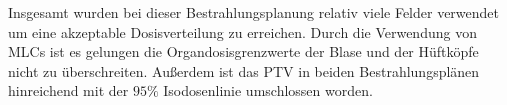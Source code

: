 Insgesamt wurden bei dieser Bestrahlungsplanung relativ viele Felder verwendet um eine
akzeptable Dosisverteilung zu erreichen. Durch die Verwendung von MLCs ist es gelungen
die Organdosisgrenzwerte der Blase und der Hüftköpfe nicht zu überschreiten.
Außerdem ist das PTV in beiden Bestrahlungsplänen hinreichend mit der $95\%$ Isodosenlinie
umschlossen worden.
